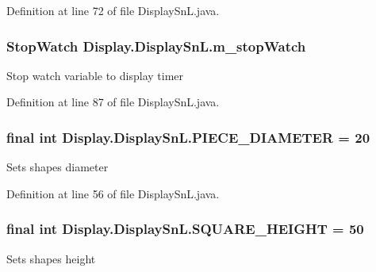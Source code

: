 Definition at line 72 of file Display\+Sn\+L.\+java.

\hypertarget{class_display_1_1_display_sn_l_a4e69018d83aaba48baa701597a876bf6}{}
\subsubsection[{m\+\_\+stop\+Watch}]{\setlength{\rightskip}{0pt plus 5cm}Stop\+Watch Display.\+Display\+Sn\+L.\+m\+\_\+stop\+Watch\hspace{0.3cm}{\ttfamily [private]}}\label{class_display_1_1_display_sn_l_a4e69018d83aaba48baa701597a876bf6}
Stop watch variable to display timer 

Definition at line 87 of file Display\+Sn\+L.\+java.

\hypertarget{class_display_1_1_display_sn_l_ac8f487404183209a60d90af4124eb61c}{}
\subsubsection[{P\+I\+E\+C\+E\+\_\+\+D\+I\+A\+M\+E\+T\+E\+R}]{\setlength{\rightskip}{0pt plus 5cm}final int Display.\+Display\+Sn\+L.\+P\+I\+E\+C\+E\+\_\+\+D\+I\+A\+M\+E\+T\+E\+R = 20\hspace{0.3cm}{\ttfamily [static]}}\label{class_display_1_1_display_sn_l_ac8f487404183209a60d90af4124eb61c}
Sets shape\textquotesingle{}s diameter 

Definition at line 56 of file Display\+Sn\+L.\+java.

\hypertarget{class_display_1_1_display_sn_l_abcf7150eb19d813f34a1cdd3708d5c83}{}
\subsubsection[{S\+Q\+U\+A\+R\+E\+\_\+\+H\+E\+I\+G\+H\+T}]{\setlength{\rightskip}{0pt plus 5cm}final int Display.\+Display\+Sn\+L.\+S\+Q\+U\+A\+R\+E\+\_\+\+H\+E\+I\+G\+H\+T = 50\hspace{0.3cm}{\ttfamily [static]}}\label{class_display_1_1_display_sn_l_abcf7150eb19d813f34a1cdd3708d5c83}
Sets shape\textquotesingle{}s height 

